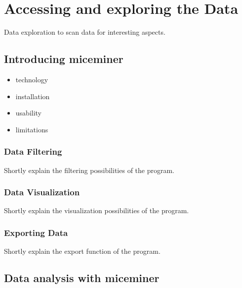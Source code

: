 \newpage
\section{Accessing and exploring the Data }
\label{sec:dataaccessandexp}


Data exploration to scan data for interesting aspects.

\subsection{Introducing miceminer}
\label{subsec:dataexp}

\begin{itemize} 
	\item technology
	\item installation	
	\item usability
	\item limitations	
\end{itemize}

\subsubsection{Data Filtering}
\label{subsubsec:datafilter}

Shortly explain the filtering possibilities of the program.

\subsubsection{Data Visualization}
\label{subsubsec:datavis}

Shortly explain the visualization possibilities of the program.

\subsubsection{Exporting Data}
\label{subsubsec:dataexp}

Shortly explain the export function of the program.

\subsection{Data analysis with miceminer}
\label{subsec:dataana} 

